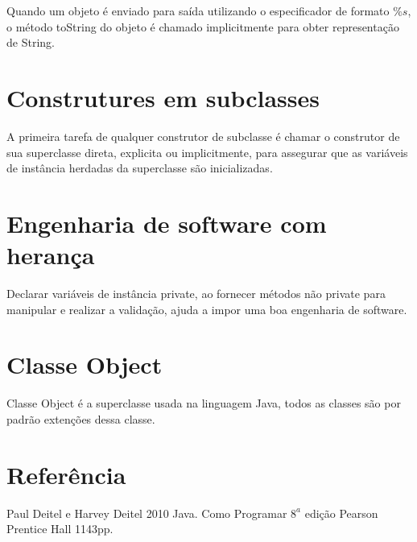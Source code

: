 \documentclass[a4paper,10pt]{article}
\begin{document}
Quando um objeto é enviado para saída utilizando o especificador de formato $\%s$, o método toString do objeto é chamado implicitmente para obter representação de String.

\section{Construtures em subclasses}

A primeira tarefa de qualquer construtor de subclasse é chamar o construtor de sua superclasse direta, explicita ou implicitmente, para assegurar que as variáveis de instância herdadas da superclasse são inicializadas.

\section{Engenharia de software com herança}

Declarar variáveis de instância private, ao fornecer métodos não private para manipular e realizar a validação, ajuda a impor uma boa engenharia de software.

\section{Classe Object}

Classe Object é a superclasse usada na linguagem Java, todos as classes são por padrão extenções dessa classe.

\section{Referência}

Paul Deitel e Harvey Deitel 2010 Java. Como Programar $8^a$ edição Pearson Prentice Hall 1143pp.
\end{document}
